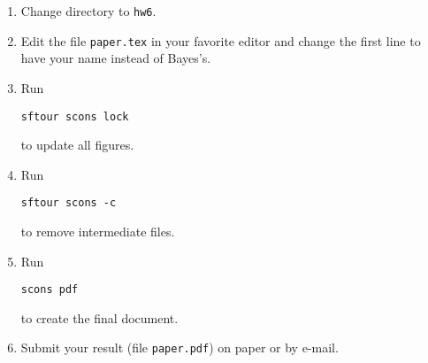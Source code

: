 \begin{enumerate}
\item Change directory to \texttt{hw6}.
\item Edit the file \texttt{paper.tex} in your favorite editor and change the
  first line to have your name instead of Bayes's.
\item Run
\begin{verbatim}
sftour scons lock
\end{verbatim}
to update all figures.
\item Run
\begin{verbatim}
sftour scons -c
\end{verbatim}
to remove intermediate files.
\item Run
\begin{verbatim}
scons pdf
\end{verbatim}
to create the final document.
\item Submit your result (file \texttt{paper.pdf}) on paper or by
e-mail.
\end{enumerate}



